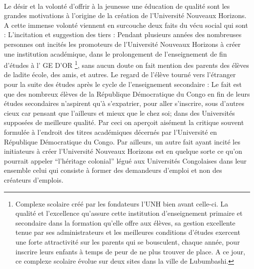 \begingroup

\paragraph{}
Le désir et la volonté d’offrir à la jeunesse une éducation de qualité sont les grandes motivations à l'origine de la création de l'Université Nouveaux Horizons. A cette immense volonté viennent en surcouche deux faits du vécu social qui sont : 
L'incitation et suggestion des tiers : 
Pendant plusieurs années des nombreuses personnes ont incités les promoteurs de l’Université Nouveaux Horizons à  créer une institution académique, dans le prolongement de l’enseignement de fin d’études  à l' GE D’OR \footnote{Complexe scolaire créé par les fondateurs l'UNH bien avant celle-ci. La qualité et l'excellence qu'assure cette institution d'enseignement primaire et secondaire dans la formation qu'elle offre aux élèves, sa gestion excellente tenue par ses administrateurs et les meilleures conditions d'études exercent une forte attractivité sur les parents qui se bousculent, chaque année, pour inscrire leurs enfants à temps de peur de ne plus trouver de place. A ce jour, ce complexe scolaire évolue sur deux sites dans la ville de Lubumbashi.}, sans aucun doute on fait mention des parents des élèves de ladite école, des amis, et autres. 
Le regard de l’élève tourné vers l’étranger pour la suite des études après le cycle de l’enseignement secondaire : 
Le fait est que des nombreux élèves de la République Démocratique du Congo en fin de leurs études secondaires n’aspirent qu'à s'expatrier, pour aller s'inscrire, sous d’autres cieux car pensant que l’ailleurs et mieux que le chez soi; dans des Universités supposées de meilleure qualité. Par ceci on aperçoit aisément la critique souvent formulée à l’endroit des titres académiques décernés par l'Université en République Démocratique du Congo.
Par ailleurs, un autre fait ayant incité les initiateurs à créer l'Université Nouveaux Horizons est en quelque sorte ce qu’on pourrait appeler “l'héritage colonial” légué aux Universités Congolaises dans leur ensemble celui qui consiste à former des demandeurs d’emploi et non des créateurs d’emplois.


\endgroup